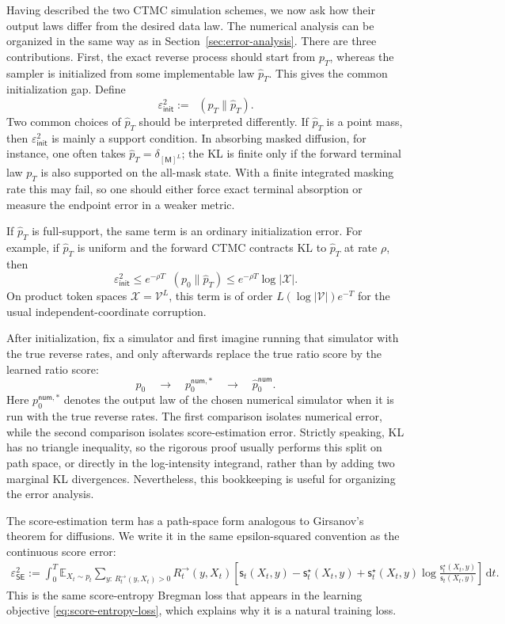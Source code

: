 \documentclass{amsart}
\numberwithin{equation}{section}
\theoremstyle{plain}
\theoremstyle{definition}
\theoremstyle{remark}
\DeclareMathOperator{\KL}{D_{\mathsf{KL}}}
\newcommand{\E}{\mathbb{E}}
\newcommand{\dd}{\,\mathrm{d}}
\newcommand{\cX}{\mathcal{X}}
\newcommand{\mc}[1]{\mathcal{#1}}
\newcommand{\wh}[1]{\widehat{#1}}
\newcommand{\sstar}{\mathsf{s}^{\star}}
\newcommand{\score}{\mathsf{s}}
\newcommand{\epsinit}{\varepsilon_{\mathsf{init}}}
\newcommand{\epsSE}{\varepsilon_{\mathsf{SE}}}
\begin{document}
Having described the two CTMC simulation schemes, we now ask how their output
laws differ from the desired data law.
The numerical analysis can be organized in the same way as in
Section~\ref{sec:error-analysis}.  There are three contributions.  First, the
exact reverse process should start from $p_T$, whereas the sampler is initialized
from some implementable law $\wh p_T$.  This gives the common initialization
gap.  Define
\[
    \epsinit^2:=\KL(p_T\|\wh p_T).
\]
Two common choices of $\wh p_T$ should be interpreted differently.  If
$\wh p_T$ is a point mass, then $\epsinit^2$ is mainly a support condition.  In
absorbing masked diffusion, for instance, one often takes
$\wh p_T=\delta_{[\mathsf M]^L}$; the KL is finite only if the forward terminal
law $p_T$ is also supported on the all-mask state.  With a finite integrated
masking rate this may fail, so one should either force exact terminal
absorption or measure the endpoint error in a weaker metric.

If $\wh p_T$ is full-support, the same term is an ordinary initialization
error.  For example, if $\wh p_T$ is uniform and the forward CTMC contracts KL
to $\wh p_T$ at rate $\rho$, then
\[
    \epsinit^2
    \leq e^{-\rho T}\KL(p_0\|\wh p_T)
    \leq e^{-\rho T}\log|\cX|.
\]
On product token spaces $\cX=\mc{V}^L$, this term is of order
$L(\log|\mc{V}|)e^{-T}$ for the usual independent-coordinate corruption.

After initialization, fix a simulator and first imagine running that simulator
with the true reverse rates, and only afterwards replace the true ratio score by
the learned ratio score:
\[
    p_0
    \quad\longrightarrow\quad
    p_0^{\mathsf{num},*}
    \quad\longrightarrow\quad
    \wh p_0^{\mathsf{num}}.
\]
Here $p_0^{\mathsf{num},*}$ denotes the output law of the chosen numerical
simulator when it is run with the true reverse rates.  The first comparison
isolates numerical error, while the second comparison isolates score-estimation
error.  Strictly speaking, KL has no triangle inequality, so the rigorous proof
usually performs this split on path space, or directly in the log-intensity
integrand, rather than by adding two marginal KL divergences.  Nevertheless,
this bookkeeping is useful for organizing the error analysis.

The score-estimation term has a path-space form analogous to Girsanov's theorem
for diffusions.  We write it in the same epsilon-squared convention as the
continuous score error:
\begin{align}\label{eq:ctmc-score-entropy-error}
    \epsSE^2
    :=
    \int_0^T
    \E_{X_t\sim p_t}
    \sum_{y:\,R_t^{\to}(y,X_t)>0}
    R_t^{\to}(y,X_t)
    \left[
    \score_t(X_t,y)
    -\sstar_t(X_t,y)
    +\sstar_t(X_t,y)
    \log
    \frac{\sstar_t(X_t,y)}{\score_t(X_t,y)}
    \right]\dd t.
\end{align}
This is the same score-entropy Bregman loss that appears in the learning
objective \eqref{eq:score-entropy-loss}, which explains why it is a natural
training loss.
\end{document}
